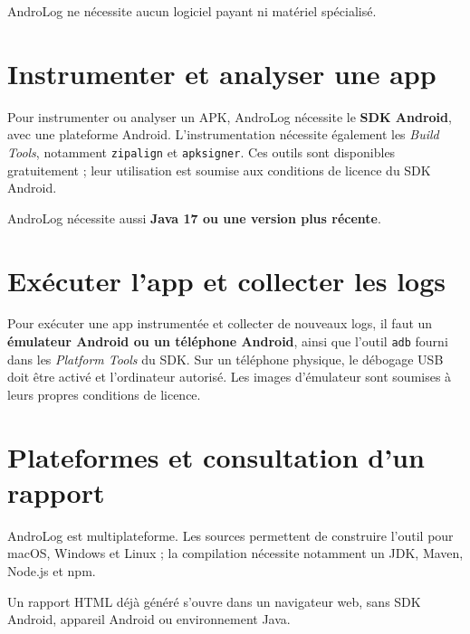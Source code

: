 \maketitle

AndroLog ne nécessite aucun logiciel payant ni matériel spécialisé.

\section{Instrumenter et analyser une app}

Pour instrumenter ou analyser un APK, AndroLog nécessite le \textbf{SDK Android}, avec une plateforme Android. L’instrumentation nécessite également les \textit{Build Tools}, notamment \texttt{zipalign} et \texttt{apksigner}. Ces outils sont disponibles gratuitement ; leur utilisation est soumise aux conditions de licence du SDK Android.

AndroLog nécessite aussi \textbf{Java 17 ou une version plus récente}.

\section{Exécuter l’app et collecter les logs}

Pour exécuter une app instrumentée et collecter de nouveaux logs, il faut un \textbf{émulateur Android ou un téléphone Android}, ainsi que l’outil \texttt{adb} fourni dans les \textit{Platform Tools} du SDK. Sur un téléphone physique, le débogage USB doit être activé et l’ordinateur autorisé. Les images d’émulateur sont soumises à leurs propres conditions de licence.

\section{Plateformes et consultation d’un rapport}

AndroLog est multiplateforme. Les sources permettent de construire l’outil pour macOS, Windows et Linux ; la compilation nécessite notamment un JDK, Maven, Node.js et npm.

Un rapport HTML déjà généré s’ouvre dans un navigateur web, sans SDK Android, appareil Android ou environnement Java.
